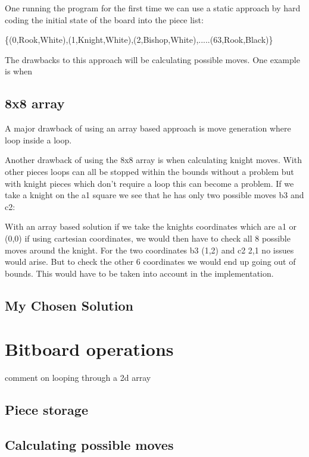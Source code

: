 \documentclass[11pt]{report}
\begin{document}
One running the program for the first time we can use a static approach by hard coding the initial state of the board into the piece list: \newline

{\Large \{(0,Rook,White),(1,Knight,White),(2,Bishop,White),.....(63,Rook,Black)\}}



The drawbacks to this approach will be calculating possible moves. One example is when 

\subsection{8x8 array}



A major drawback of using an array based approach is move generation where loop inside a loop.

Another drawback of using the 8x8 array is when calculating knight moves. With other pieces loops can all be stopped within the bounds without a problem but with knight pieces which don't require a loop this can become a problem. If we take a knight on the a1 square we see that he has only two possible moves b3 and c2:

\newgame
{}
\showboard

With an array based solution if we take the knights coordinates which are a1 or (0,0) if using cartesian coordinates, we would then have to check all 8 possible moves around the knight. For the two coordinates b3 (1,2) and c2 2,1 no issues would arise. But to check the other 6 coordinates we would end up going out of bounds. This would have to be taken into account in the implementation.


\subsection{My Chosen Solution}

\section{Bitboard operations}
comment on looping through a 2d array
\subsection{Piece storage}
\subsection{Calculating possible moves}
\end{document}
